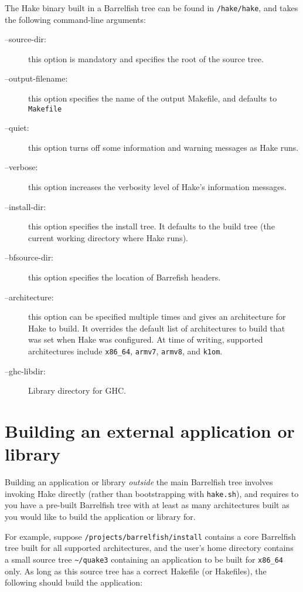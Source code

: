 \documentclass[a4paper,twoside]{report} %
\begin{document}
The Hake binary built in a Barrelfish tree can be found in
\texttt{/hake/hake}, and takes the following command-line arguments:
\begin{description}
\item[--source-dir:] this option is mandatory and specifies the root
  of the source tree.
\item[--output-filename:] this option specifies the name of the output
  Makefile, and defaults to \texttt{Makefile}
\item[--quiet:] this option turns off some information and warning
  messages as Hake runs.
\item[--verbose:] this option increases the verbosity level of Hake's
  information messages.
\item[--install-dir:] this option specifies the install tree.  It
  defaults to the build tree (the current working directory where Hake runs).
\item[--bfsource-dir:] this option specifies the location of Barrefish headers.
\item[--architecture:] this option can be specified multiple times and
  gives an architecture for Hake to build.  It overrides the default
  list of architectures to build that was set when Hake was
  configured.  At time of writing, supported architectures include
  \texttt{x86\_64}, \texttt{armv7}, \texttt{armv8},
  and \texttt{k1om}.
\item[--ghc-libdir:] Library directory for GHC.
\end{description}

\section{Building an external application or library}

Building an application or library \emph{outside} the main Barrelfish
tree involves invoking Hake directly (rather than bootstrapping with
\texttt{hake.sh}), and requires to you have a pre-built Barrelfish
tree with at least as many architectures built as you would like to
build the application or library for.

For example, suppose \texttt{/projects/barrelfish/install} contains a
core Barrelfish tree built for all supported architectures, and the
user's home directory contains a small source tree
\verb!~/quake3! containing an application to be built for
\texttt{x86\_64} only.  As long as this source tree has a correct
Hakefile (or Hakefiles), the following should build the application:
\end{document}
